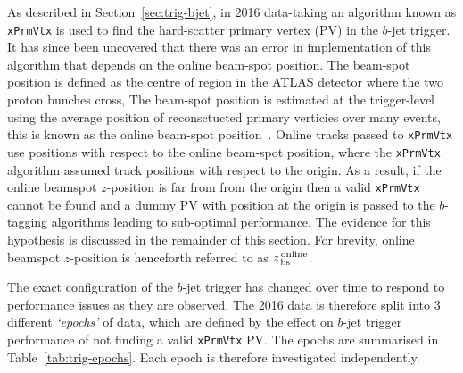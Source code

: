 As described in Section~\ref{sec:trig-bjet}, in 2016 data-taking an algorithm known as \verb|xPrmVtx| is used to find the hard-scatter primary vertex (PV) in the $b$-jet trigger.
It has since been uncovered that there was an error in implementation of this algorithm that depends on the online beam-spot position.
The beam-spot position is defined as the centre of region in the ATLAS detector where the two proton bunches cross,
The beam-spot position is estimated at the trigger-level using the average position of reconsctucted primary verticies over many events,
this is known as the online beam-spot position~\cite{trig-onlinePV}.
Online tracks passed to \verb|xPrmVtx| use positions with respect to the online beam-spot position,
where the \verb|xPrmVtx| algorithm assumed track positions with respect to the origin.
As a result, if the online beamspot $z$-position is far from from the origin then
a valid \verb|xPrmVtx| cannot be found and a dummy PV with position at the origin is passed to the $b$-tagging algorithms
leading to sub-optimal performance. The evidence for this hypothesis is discussed in the remainder of this section.
For brevity, online beamspot $z$-position is henceforth referred to as $z_{\,\text{bs}}^{\text{\,online}}$.  

The exact configuration of the $b$-jet trigger has changed over time to respond to performance issues as they are observed.
The 2016 data is therefore split into 3 different \textit{`epochs'} of data, which are defined by the effect on $b$-jet trigger performance of not finding a valid \verb|xPrmVtx| PV.
The epochs are summarised in Table~\ref{tab:trig-epochs}.
Each epoch is therefore investigated independently.
 
